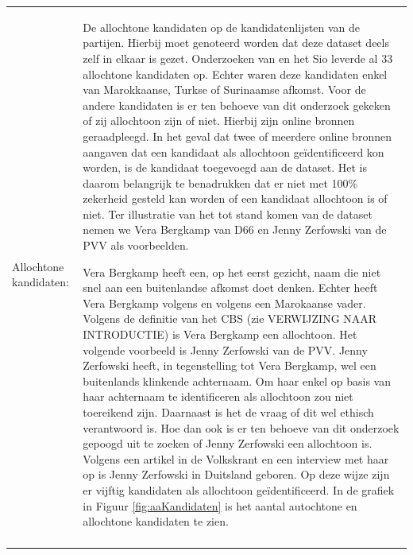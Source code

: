 \noindent\begin{tabularx}{\textwidth}{LI}
Allochtone kandidaten: & De allochtone kandidaten op de kandidatenlijsten van de partijen. Hierbij moet genoteerd worden dat deze dataset deels zelf in elkaar is gezet. Onderzoeken van \citet{marinissen2013stemmen} en het Sio \citeyear{SIO} leverde al 33 allochtone kandidaten op. Echter waren deze kandidaten enkel van Marokkaanse, Turkse of Surinaamse afkomst. Voor de andere kandidaten is er ten behoeve van dit onderzoek gekeken of zij allochtoon zijn of niet. Hierbij zijn online bronnen geraadpleegd. In het geval dat twee of meerdere online bronnen aangaven dat een kandidaat als allochtoon geïdentificeerd kon worden, is de kandidaat toegevoegd aan de dataset. Het is daarom belangrijk te benadrukken dat er niet met 100\% zekerheid gesteld kan worden of een kandidaat allochtoon is of niet. Ter illustratie van het tot stand komen van de dataset nemen we Vera Bergkamp van D66 en Jenny Zerfowski van de PVV als voorbeelden.

\indent Vera Bergkamp heeft een, op het eerst gezicht, naam die niet snel aan een buitenlandse afkomst doet denken. Echter heeft Vera Bergkamp volgens \citet{allochtonie} en volgens \citet{zaman} een Marokaanse vader. Volgens de definitie van het CBS (zie VERWIJZING NAAR INTRODUCTIE) is Vera Bergkamp een allochtoon. Het volgende voorbeeld is Jenny Zerfowski van de PVV. Jenny Zerfowski heeft, in tegenstelling tot Vera Bergkamp, wel een buitenlands klinkende achternaam. Om haar enkel op basis van haar achternaam te identificeren als allochtoon zou niet toereikend zijn. Daarnaast is het de vraag of dit wel ethisch verantwoord is. Hoe dan ook is er ten behoeve van dit onderzoek gepoogd uit te zoeken of Jenny Zerfowski een allochtoon is. Volgens een artikel in de Volkskrant\citeyearpar{volkskrantjenny} en een interview met haar op \citet{binnenlandsbestuur} is Jenny Zerfowski in Duitsland geboren. Op deze wijze zijn er vijftig kandidaten als allochtoon geïdentificeerd. In de grafiek in Figuur \ref{fig:aaKandidaten} is het aantal autochtone en allochtone kandidaten te zien.\\
  \\
\end{tabularx}







